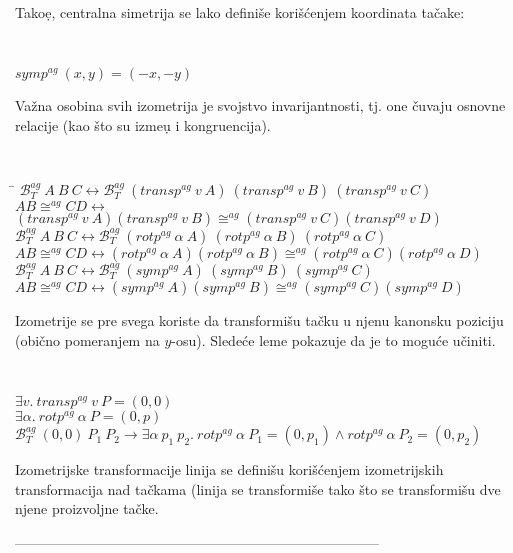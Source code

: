 \documentclass[a4paper, 12pt]{article}
\newcommand{\agbett}[3]{\ensuremath{\mathcal{B}_T^{\mathit{ag}}\ #1\ #2\ #3}}
\newcommand{\agcongr}[4]{\ensuremath{#1#2 \cong^{ag} #3#4}}
\newcommand{\agtransp}[2]{\ensuremath{transp^{ag}\ #1\ #2}}
\newcommand{\agrotp}[2]{\ensuremath{rotp^{ag}\ #1\ #2}}
\newcommand{\agsymp}[1]{\ensuremath{symp^{ag}\ #1}}
\begin{document}
Tako\d e, centralna simetrija se lako defini\v se kori\v s\'cenjem
koordinata ta\v cake:
 {\tt
\begin{tabbing}
$\agsymp{(x, y)} = (-x, -y)$
\end{tabbing}
}

Va\v zna osobina svih izometrija je svojstvo invarijantnosti, tj.
one \v cuvaju osnovne relacije (kao \v sto su izme\d u i
kongruencija).

{\tt
\begin{tabbing}
\hspace{5mm}\=\kill
$ \agbett{A}{B}{C} \longleftrightarrow \agbett{(\agtransp{v}{A})}{(\agtransp{v}{B})}{(\agtransp{v}{C})}$\\
$\agcongr{A}{B}{C}{D} \longleftrightarrow$\\
\> $\agcongr{(\agtransp{v}{A})}{(\agtransp{v}{B})}{(\agtransp{v}{C})}{(\agtransp{v}{D})}$\\
$\agbett{A}{B}{C} \longleftrightarrow \agbett{(\agrotp{\alpha}{A})}{(\agrotp{\alpha}{B})}{(\agrotp{\alpha}{C})}$\\
$\agcongr{A}{B}{C}{D} \longleftrightarrow
   \agcongr{(\agrotp{\alpha}{A})}{(\agrotp{\alpha}{B})}{(\agrotp{\alpha}{C})}{(\agrotp{\alpha}{D})}$\\
$\agbett{A}{B}{C} \longleftrightarrow \agbett{(\agsymp{A})}{(\agsymp{B})}{(\agsymp{C})}$\\
$\agcongr{A}{B}{C}{D} \longleftrightarrow
   \agcongr{(\agsymp{A})}{(\agsymp{B})}{(\agsymp{C})}{(\agsymp{D})}$
\end{tabbing}
}

Izometrije se pre svega koriste da transformi\v su ta\v cku u
njenu kanonsku poziciju (obi\v cno pomeranjem na $y$-osu).
Slede\'ce leme pokazuje da je to mogu\'ce u\v ciniti.

{\tt
\begin{tabbing}
$\exists v.\ \agtransp{v}{P} = (0, 0)$\\
$\exists \alpha.\ \agrotp{\alpha}{P} = (0, p)$\\
$\agbett{(0, 0)}{P_1}{P_2} \longrightarrow \exists \alpha\ p_1\
p_2.\ \agrotp{\alpha}{P_1} = (0, p_1) \wedge \agrotp{\alpha}{P_2}
= (0, p_2)$
\end{tabbing}
}

Izometrijske transformacije linija se defini\v su kori\v s\'cenjem
izometrijskih transformacija nad ta\v ckama (linija se
transformi\v se tako \v sto se transformi\v su dve njene
proizvoljne ta\v cke.

 ------------------------------------------------------------------------------
\end{document}
